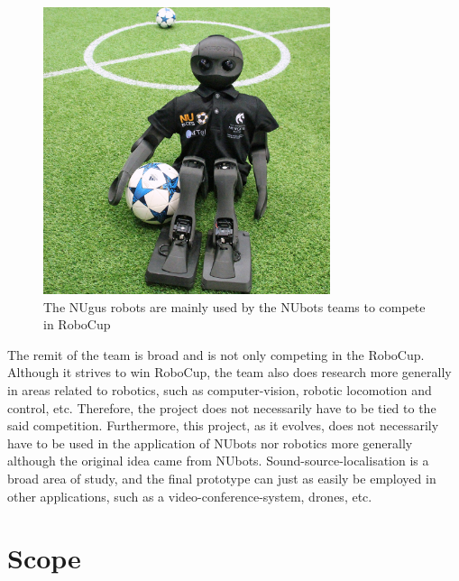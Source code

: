 \documentclass{report}
\begin{document}
\begin{figure}[H]
\includegraphics[width=0.75\textwidth]{./NUbot-sitting-down.jpg}
\centering
\caption{The NUgus robots are mainly used by the NUbots teams to compete in RoboCup}
\label{fig:nuguses}
\centering
\end{figure}

The remit of the team is broad and is not only competing in the RoboCup. Although it strives to win RoboCup, the team also does research more generally in areas related to robotics, such as computer-vision, robotic locomotion and control, etc. Therefore, the project does not necessarily have to be tied to the said competition. Furthermore, this project, as it evolves, does not necessarily have to be used in the application of NUbots nor robotics more generally although the original idea came from NUbots. Sound-source-localisation is a broad area of study, and the final prototype can just as easily be employed in other applications, such as a video-conference-system, drones, etc.

\section{Scope}
\end{document}

